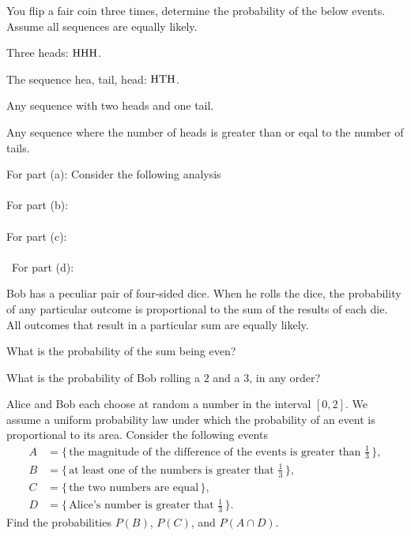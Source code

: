 \begin{problem}
  You flip a fair coin three times, determine the probability of the below
  events. Assume all sequences are equally likely.
  \begin{alphlist}
  \item Three heads: \(\mathrm{H}\mathrm{H}\mathrm{H}\).
  \item The sequence hea, tail, head: \(\mathrm{H}\mathrm{T}\mathrm{H}\).
  \item Any sequence with two heads and one tail.
  \item Any sequence where the number of heads is greater than or eqal to
    the number of tails.
  \end{alphlist}
\end{problem}
\begin{solution*}
  For part (a): Consider the following analysis
  \\\\
  For part (b):
  \\\\
  For part (c):
  \\\\\
  For part (d):
\end{solution*}

\begin{problem}
  Bob has a peculiar pair of four-sided dice. When he rolls the dice, the
  probability of any particular outcome is proportional to the sum of the
  results of each die. All outcomes that result in a particular sum are
  equally likely.
  \begin{alphlist}
  \item What is the probability of the sum being even?
  \item What is the probability of Bob rolling a \(2\) and a \(3\), in any
    order?
  \end{alphlist}
\end{problem}
\begin{solution*}
\end{solution*}

\begin{problem}
  Alice and Bob each choose at random a number in the interval
  \([0,2]\). We assume a uniform probability law under which the
  probability of an event is proportional to its area. Consider the
  following events
  \begin{align*}
    A&=\bigl\{\,\text{the magnitude of the difference of the events is
       greater than \(\tfrac{1}{3}\)}\,\bigr\},\\
    B&=\bigl\{\,\text{at least one of the numbers is greater that
       \(\tfrac{1}{3}\)}\,\bigr\},\\
    C&=\bigl\{\,\text{the two numbers are equal}\,\bigr\},\\
    D&=\bigl\{\,\text{Alice's number is greater that \(\tfrac{1}{3}\)}\,\bigr\}.
  \end{align*}
  Find the probabilities \(P(B)\), \(P(C)\), and \(P(A\cap D)\).
\end{problem}
\begin{solution*}
\end{solution*}

